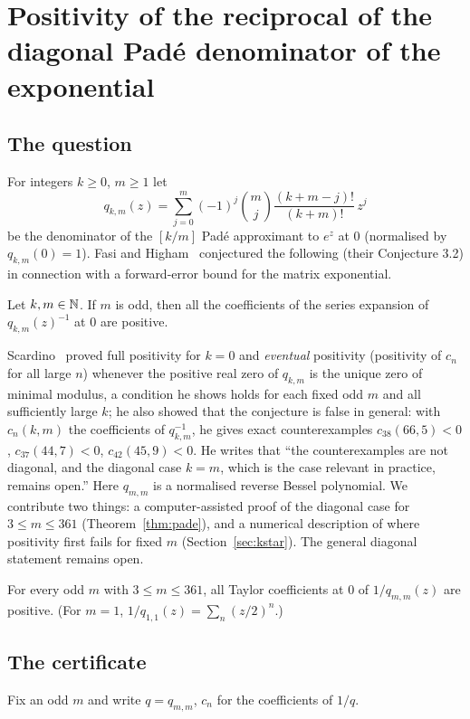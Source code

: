 \section{Positivity of the reciprocal of the diagonal Pad\'e denominator of the exponential}\label{sec:pade}

\subsection{The question}
For integers $k\ge0$, $m\ge1$ let
\[
q_{k,m}(z)=\sum_{j=0}^{m}(-1)^j\binom mj\frac{(k+m-j)!}{(k+m)!}\,z^j
\]
be the denominator of the $[k/m]$ Pad\'e approximant to $e^z$ at $0$ (normalised by $q_{k,m}(0)=1$). Fasi and Higham~\cite{FH} conjectured the following (their Conjecture 3.2) in connection with a forward-error bound for the matrix exponential.

\begin{conjecture}\label{conj:fh}
Let $k,m\in\mathbb{N}$. If $m$ is odd, then all the coefficients of the series expansion of $q_{k,m}(z)^{-1}$ at $0$ are positive.
\end{conjecture}

Scardino~\cite{Scardino} proved full positivity for $k=0$ and \emph{eventual} positivity (positivity of $c_n$ for all large $n$) whenever the positive real zero of $q_{k,m}$ is the unique zero of minimal modulus, a condition he shows holds for each fixed odd $m$ and all sufficiently large $k$; he also showed that the conjecture is false in general: with $c_n(k,m)$ the coefficients of $q_{k,m}^{-1}$, he gives exact counterexamples $c_{38}(66,5)<0$, $c_{37}(44,7)<0$, $c_{42}(45,9)<0$. He writes that ``the counterexamples are not diagonal, and the diagonal case $k=m$, which is the case relevant in practice, remains open.'' Here $q_{m,m}$ is a normalised reverse Bessel polynomial. We contribute two things: a computer-assisted proof of the diagonal case for $3\le m\le361$ (Theorem~\ref{thm:pade}), and a numerical description of where positivity first fails for fixed $m$ (Section~\ref{sec:kstar}). The general diagonal statement remains open.

\begin{theorem}\label{thm:pade}
For every odd $m$ with $3\le m\le 361$, all Taylor coefficients at $0$ of $1/q_{m,m}(z)$ are positive. (For $m=1$, $1/q_{1,1}(z)=\sum_n (z/2)^n$.)
\end{theorem}

\subsection{The certificate}
Fix an odd $m$ and write $q=q_{m,m}$, $c_n$ for the coefficients of $1/q$.

